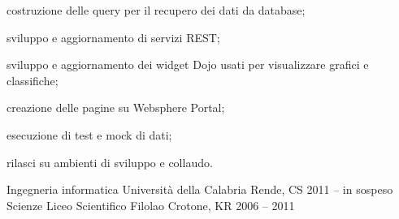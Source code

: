 \documentclass[]{style}
\begin{document}
\begin{cventries}
{\begin{cventryparagraph}
    	{\begin{cventryparagraphlist}
    		\item {costruzione delle query per il recupero dei dati da database;}
    		\item {sviluppo e aggiornamento di servizi REST;}
    		\item {sviluppo e aggiornamento dei widget Dojo usati per visualizzare grafici e classifiche;}
    		\item {creazione delle pagine su Websphere Portal;}
    		\item {esecuzione di test e mock di dati;}
    		\item {rilasci su ambienti di sviluppo e collaudo.}
    	\end{cventryparagraphlist}}
	\end{cventryparagraph}}
\end{cventries}
\pagebreak[4]

\begin{cventries}
	\cventry
	{Ingegneria informatica}
	{Università della Calabria}
	{Rende, CS}
	{2011 – in sospeso}
	{}
	\cventry
	{Scienze}
	{Liceo Scientifico Filolao}
	{Crotone, KR}
	{2006 – 2011}
	{}
\end{cventries}
\end{document}
